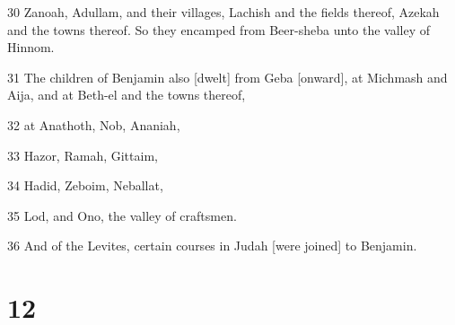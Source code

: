 \par 30 Zanoah, Adullam, and their villages, Lachish and the fields thereof, Azekah and the towns thereof. So they encamped from Beer-sheba unto the valley of Hinnom.
\par 31 The children of Benjamin also [dwelt] from Geba [onward], at Michmash and Aija, and at Beth-el and the towns thereof,
\par 32 at Anathoth, Nob, Ananiah,
\par 33 Hazor, Ramah, Gittaim,
\par 34 Hadid, Zeboim, Neballat,
\par 35 Lod, and Ono, the valley of craftsmen.
\par 36 And of the Levites, certain courses in Judah [were joined] to Benjamin.

\chapter{12}

